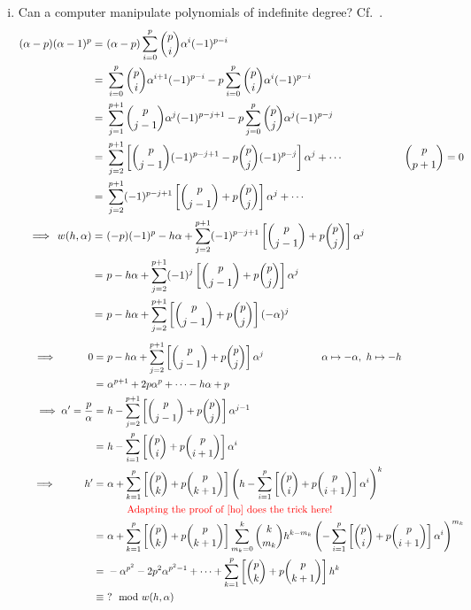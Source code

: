 \documentclass{rs}
\theoremstyle{definition}
\theoremstyle{remark}
\newcommand{\md}{~~{\rm mod}~}
\newcommand{\A}{\alpha}
\renewcommand{\=}{\approx}
\renewcommand{\-}{\sim}
\newcommand{\rd}[1]{{\textcolor{red}{#1}}}
\renewcommand{\c}[2]{{#1 \choose #2}}
\numberwithin{equation}{section}
\begin{document}
\begin{enumerate}[(i)]
 \item Can a computer manipulate polynomials of indefinite degree?  Cf.~\cite[Appendix C]{Kerner}.  
 \[
  \begin{split}
   (\A - p) (\A - 1)^p = & ~ (\A - p) \sum_{i = 0}^p \c{p}{i} \A^i (-1)^{p - i} \\
                       = & ~ \sum_{i = 0}^p \c{p}{i} \A^{i + 1} (-1)^{p - i} - p \sum_{i = 0}^p \c{p}{i} \A^i (-1)^{p - i} \\
                       = & ~ \sum_{j = 1}^{p + 1} \c{p}{j - 1} \A^j (-1)^{p - j + 1} - p \sum_{j = 0}^p \c{p}{j} \A^j (-1)^{p - j} \\
                       = & ~ \sum_{j = 2}^{p + 1} \left[ \c{p}{j - 1} (-1)^{p - j + 1} - p \c{p}{j} (-1)^{p - j} \right] \A^j + \cdots \hskip 2cm \c{p}{p + 1} = 0 \\
                       = & ~ \sum_{j = 2}^{p + 1} (-1)^{p - j + 1} \left[ \c{p}{j - 1} + p \c{p}{j} \right] \A^j + \cdots \\
   \implies \, w(h,\A) = & ~ (-p) (-1)^p - h \A + \sum_{j = 2}^{p + 1} (-1)^{p - j + 1} \left[ \c{p}{j - 1} + p \c{p}{j} \right] \A^j \\
                       = & ~ p - h \A + \sum_{j = 2}^{p + 1} (-1)^j \left[ \c{p}{j - 1} + p \c{p}{j} \right] \A^j \\
                       = & ~ p - h \A + \sum_{j = 2}^{p + 1} \left[ \c{p}{j - 1} + p \c{p}{j} \right] (-\A)^j 
  \end{split}
 \]
 \[
  \hskip .5cm
  \begin{split}
         \implies \hskip 1cm 0 = & ~ p - h \A + \sum_{j = 2}^{p + 1} \left[ \c{p}{j - 1} + p \c{p}{j} \right] \A^j \hskip 2cm \A \mapsto -\A, ~ h \mapsto -h \\
                               = & ~ \A^{p + 1} + 2 p \A^p + \cdots - h \A + p \\
   \implies \A' = \frac{p}{\A} = & ~ h - \sum_{j = 2}^{p + 1} \left[ \c{p}{j - 1} + p \c{p}{j} \right] \A^{j - 1} \\
                               = & ~ h - \sum_{i = 1}^p \left[ \c{p}{i} + p \c{p}{i + 1} \right] \A^i \\
       \implies \hskip .9cm h' = & ~ \A + \sum_{k = 1}^p \left[ \c{p}{k} + p \c{p}{k + 1} \right] \left( h - \sum_{i = 1}^p \left[ \c{p}{i} + p \c{p}{i + 1} \right] \A^i \right)^k \\
                                 & \hskip .8cm \text{\rd{Adapting the proof of \cite[Proposition 6.4]{ho} does the trick here!}} \\
                               = & ~ \A + \sum_{k = 1}^p \left[ \c{p}{k} + p \c{p}{k + 1} \right] \sum_{m_k = 0}^k \c{k}{m_k} h^{k - m_k} \left( - \sum_{i = 1}^p \left[ \c{p}{i} + p \c{p}{i + 1} \right] \A^i \right)^{m_k} \\
                               = & ~ -\A^{p^2} - 2 p^2 \A^{p^2 - 1} + \cdots + \sum_{k = 1}^p \left[ \c{p}{k} + p \c{p}{k + 1} \right] h^k \\
                          \equiv & ~ ? \md w(h,\A) 
  \end{split}
 \]


\end{enumerate}
\end{document}
